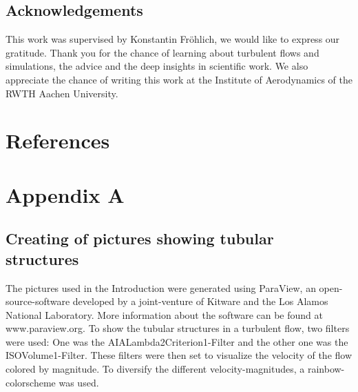 \documentclass[11pt,a4paper,openany,oneside,parskip=half*]{article}
\begin{document}
\subsection*{Acknowledgements}
This work was supervised by Konstantin Fr\"ohlich, we would like to express our gratitude. Thank you for the chance of learning about turbulent flows and simulations, the advice and the deep insights in scientific work. We also appreciate the chance of writing this work at the Institute of Aerodynamics of the RWTH Aachen University.
\pagebreak
\section{References}
\nocite{*} %
\pagebreak
\section{Appendix A}
\subsection*{Creating of pictures showing tubular structures}
The pictures used in the Introduction were generated using ParaView, an open-source-software developed by a joint-venture of Kitware and the Los Alamos National Laboratory. More information about the software can be found at www.paraview.org. To show the tubular structures in a turbulent flow, two filters were used: One was the AIALambda2Criterion1-Filter and the other one was the ISOVolume1-Filter. These filters were then set to visualize the velocity of the flow colored by magnitude. To diversify the different velocity-magnitudes, a rainbow-colorscheme was used. 
\end{document}
